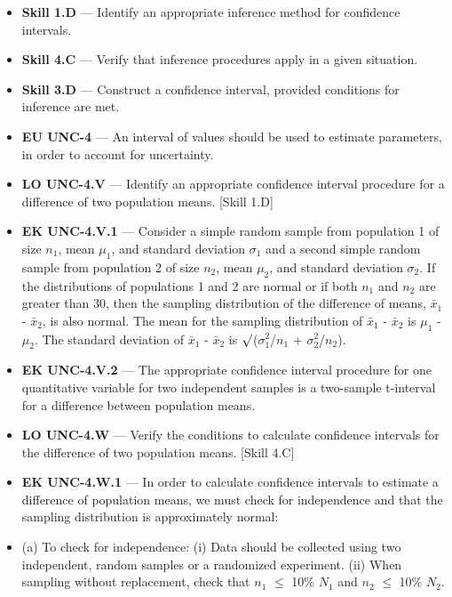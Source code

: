 \documentclass[11pt]{article}
\begin{document}


{\small
\begin{itemize}[leftmargin=1.5em,itemsep=2pt,topsep=2pt]
  \item \textbf{Skill 1.D} --- Identify an appropriate inference method for confidence intervals.
  \item \textbf{Skill 4.C} --- Verify that inference procedures apply in a given situation.
  \item \textbf{Skill 3.D} --- Construct a confidence interval, provided conditions for inference are met.
  \item \textbf{EU UNC-4} --- An interval of values should be used to estimate parameters, in order to account for uncertainty.
  \item \textbf{LO UNC-4.V} --- Identify an appropriate confidence interval procedure for a difference of two population means. [Skill 1.D]
  \item \textbf{EK UNC-4.V.1} --- Consider a simple random sample from population 1 of size $n_1$, mean $\mu_1$, and standard deviation $\sigma_1$ and a second simple random sample from population 2 of size $n_2$, mean $\mu_2$, and standard deviation $\sigma_2$. If the distributions of populations 1 and 2 are normal or if both $n_1$ and $n_2$ are greater than 30, then the sampling distribution of the difference of means, $\bar{x}_1$ - $\bar{x}_2$, is also normal. The mean for the sampling distribution of $\bar{x}_1$ - $\bar{x}_2$ is $\mu_1$ - $\mu_2$. The standard deviation of $\bar{x}_1$ - $\bar{x}_2$ is $\surd$($\sigma_1^2$/$n_1$ + $\sigma_2^2$/$n_2$).
  \item \textbf{EK UNC-4.V.2} --- The appropriate confidence interval procedure for one quantitative variable for two independent samples is a two-sample t-interval for a difference between population means.
  \item \textbf{LO UNC-4.W} --- Verify the conditions to calculate confidence intervals for the difference of two population means. [Skill 4.C]
  \item \textbf{EK UNC-4.W.1} --- In order to calculate confidence intervals to estimate a difference of population means, we must check for independence and that the sampling distribution is approximately normal:
  \item (a) To check for independence: (i) Data should be collected using two independent, random samples or a randomized experiment. (ii) When sampling without replacement, check that $n_1$ $\leq$ 10\% $N_1$ and $n_2$ $\leq$ 10\% $N_2$.

\end{itemize}}
\end{document}
